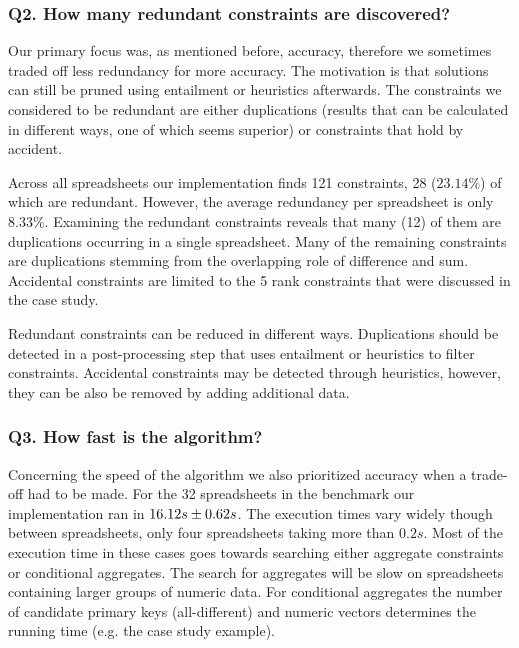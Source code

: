 \documentclass{IEEEtran}
\theoremstyle{definition}
\begin{document}
\subsubsection*{Q2. How many redundant constraints are discovered?}
Our primary focus was, as mentioned before, accuracy, therefore we sometimes traded off less redundancy for more accuracy.
The motivation is that solutions can still be pruned using entailment or heuristics afterwards.
The constraints we considered to be redundant are either duplications (results that can be calculated in different ways, one of which seems superior) or constraints that hold by accident.

Across all spreadsheets our implementation finds 121 constraints, 28 ($23.14\%$) of which are redundant.
However, the average redundancy per spreadsheet is only $8.33\%$.
Examining the redundant constraints reveals that many (12) of them are duplications occurring in a single spreadsheet.
Many of the remaining constraints are duplications stemming from the overlapping role of difference and sum.
Accidental constraints are limited to the 5 rank constraints that were discussed in the case study.

Redundant constraints can be reduced in different ways.
Duplications should be detected in a post-processing step that uses entailment or heuristics to filter constraints.
Accidental constraints may be detected through heuristics, however, they can be also be removed by adding additional data.

\subsubsection*{Q3. How fast is the algorithm?}
Concerning the speed of the algorithm we also prioritized accuracy when a trade-off had to be made.
For the 32 spreadsheets in the benchmark our implementation ran in ${16.12}s \pm {0.62}s$.
The execution times vary widely though between spreadsheets, only four spreadsheets taking more than $0.2s$.
Most of the execution time in these cases goes towards searching either aggregate constraints or conditional aggregates.
The search for aggregates will be slow on spreadsheets containing larger groups of numeric data.
For conditional aggregates the number of candidate primary keys (all-different) and numeric vectors determines the running time (e.g. the case study example).
\end{document}
